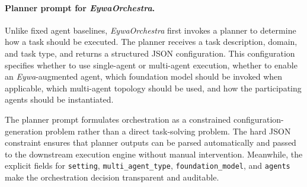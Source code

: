 \documentclass{llmxive}
\begin{document}
{\paragraph{Planner prompt for \textit{EywaOrchestra}.}
Unlike fixed agent baselines, \textit{EywaOrchestra} first invokes a planner to determine how a task should be executed. The planner receives a task description, domain, and task type, and returns a structured JSON configuration. This configuration specifies whether to use single-agent or multi-agent execution, whether to enable an \textit{Eywa}-augmented agent, which foundation model should be invoked when applicable, which multi-agent topology should be used, and how the participating agents should be instantiated.

The planner prompt formulates orchestration as a constrained configuration-generation problem rather than a direct task-solving problem. The hard JSON constraint ensures that planner outputs can be parsed automatically and passed to the downstream execution engine without manual intervention. Meanwhile, the explicit fields for \texttt{setting}, \texttt{multi\_agent\_type}, \texttt{foundation\_model}, and \texttt{agents} make the orchestration decision transparent and auditable.



\begin{figure}[!htbp]
\centering
{}
\end{figure}}
\end{document}
